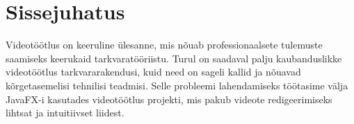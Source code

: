 \section*{Sissejuhatus}
\RaggedRight
\justify 
Videotöötlus on keeruline ülesanne, mis nõuab professionaalsete tulemuste saamiseks keerukaid tarkvaratööriistu. Turul on saadaval palju kaubanduslikke videotöötlus tarkvararakendusi, kuid need on sageli kallid ja nõuavad kõrgetasemelisi tehnilisi teadmisi. Selle probleemi lahendamiseks töötasime välja JavaFX-i kasutades videotöötlus projekti, mis pakub videote redigeerimiseks lihtsat ja intuitiivset liidest. 
\newpage